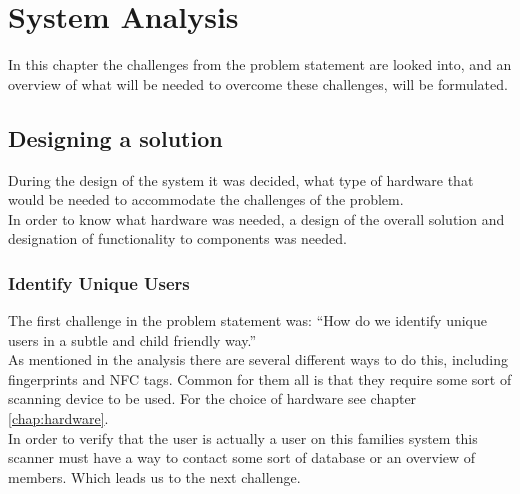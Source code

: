 \chapter{System Analysis}
In this chapter the challenges from the problem statement are looked into, and an overview of what will be needed to overcome these challenges, will be formulated.


\section{Designing a solution}
During the design of the system it was decided, what type of hardware that would be needed to accommodate the challenges of the problem.\\
In order to know what hardware was needed, a design of the overall solution and designation of functionality to components was needed.\\

\subsection{Identify Unique Users}
The first challenge in the problem statement was: ``How do we identify unique users in a subtle and child friendly way.''\\
As mentioned in the analysis there are several different ways to do this, including fingerprints and NFC tags. Common for them all is that they require some sort of scanning device to be used. For the choice of hardware see chapter \ref{chap:hardware}.\\
In order to verify that the user is actually a user on this families system this scanner must have a way to contact some sort of database or an overview of members. Which leads us to the next challenge.

